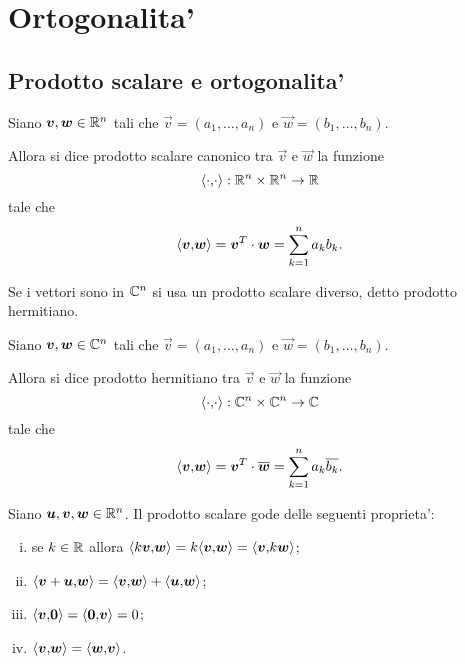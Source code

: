 \chapter{Ortogonalita'}

\section{Prodotto scalare e ortogonalita'}

\begin{definition}
    Siano $\bm{v}, \bm{w} \in \mathbb{R}^n$ tali che $\vec v = (a_1, \dots, a_n)$ e $\vec w = (b_1, \dots, b_n)$.
    
    Allora si dice prodotto scalare canonico tra $\vec{v}$ e $\vec w$ la funzione \[
        \langle \cdot{,}\cdot\rangle : \mathbb{R}^n \times \mathbb{R}^n \to \mathbb{R}
    \] tale che \[
        \langle \bm{v}{,}\bm{w}\rangle = \bm{v}^T \cdot \bm{w} = \sum_{k = 1}^n a_kb_k.
    \]
\end{definition}

Se i vettori sono in $\mathbb{C}^n$ si usa un prodotto scalare diverso, detto prodotto hermitiano.

\begin{definition}
    Siano $\bm{v}, \bm{w} \in \mathbb{C}^n$ tali che $\vec v = (a_1, \dots, a_n)$ e $\vec w = (b_1, \dots, b_n)$.
    
    Allora si dice prodotto hermitiano tra $\vec{v}$ e $\vec w$ la funzione \[
        \langle \cdot{,}\cdot\rangle : \mathbb{C}^n \times \mathbb{C}^n \to \mathbb{C}
    \] tale che \[
        \langle \bm{v}{,}\bm{w}\rangle = \bm{v}^T \cdot \overline{\bm{w}} = \sum_{k = 1}^n a_k\overline{b_k}.
    \]
\end{definition}

\begin{proposition}
    Siano $\bm{u}, \bm{v}, \bm{w} \in \mathbb{R}^n$. 
    Il prodotto scalare gode delle seguenti proprieta':
    \begin{enumerate}[(i)]
        \item se $k \in \mathbb{R}$ allora $\langle k\bm{v}{,}\bm{w}\rangle = k\langle \bm{v}{,}\bm{w}\rangle = \langle \bm{v}{,}k\bm{w}\rangle$;
        \item $\langle \bm{v} + \bm{u}{,}\bm{w}\rangle = \langle \bm{v}{,}\bm{w}\rangle + \langle \bm{u}{,}\bm{w}\rangle$;
        \item $\langle \bm{v}{,}\bm{0}\rangle = \langle \bm{0}{,}\bm{v}\rangle = 0$;
        \item $\langle \bm{v}{,}\bm{w}\rangle = \langle \bm{w}{,}\bm{v}\rangle$.
    \end{enumerate}
\end{proposition}

